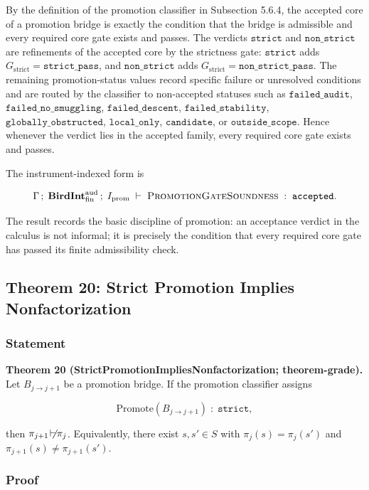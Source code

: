 \documentclass[11pt]{article}
\providecommand{\factor}{\mathrel{\!\vdash\!}}
\theoremstyle{definition}
\begin{document}
By the definition of the promotion classifier in Subsection 5.6.4, the accepted core of a promotion bridge is exactly the condition that the bridge is admissible and every required core gate exists and passes. The verdicts \(\texttt{strict}\) and \(\texttt{non\_strict}\) are refinements of the accepted core by the strictness gate: \(\texttt{strict}\) adds \(G_{\mathrm{strict}}=\texttt{strict\_pass}\), and \(\texttt{non\_strict}\) adds \(G_{\mathrm{strict}}=\texttt{non\_strict\_pass}\). The remaining promotion-status values record specific failure or unresolved conditions and are routed by the classifier to non-accepted statuses such as \(\texttt{failed\_audit}\), \(\texttt{failed\_no\_smuggling}\), \(\texttt{failed\_descent}\), \(\texttt{failed\_stability}\), \(\texttt{globally\_obstructed}\), \(\texttt{local\_only}\), \(\texttt{candidate}\), or \(\texttt{outside\_scope}\). Hence whenever the verdict lies in the accepted family, every required core gate exists and passes.

The instrument-indexed form is

\[
\Gamma\,;\;\mathbf{BirdInt}^{\mathrm{aud}}_{\mathrm{fin}}\,;\;I_{\mathrm{prom}}\;\vdash\;\textsc{PromotionGateSoundness}\;:\;\texttt{accepted}.
\]

The result records the basic discipline of promotion: an acceptance verdict in the calculus is not informal; it is precisely the condition that every required core gate has passed its finite admissibility check.

\subsection{Theorem 20: Strict Promotion Implies Nonfactorization}

\subsubsection{Statement}

\textbf{Theorem 20 (StrictPromotionImpliesNonfactorization; theorem-grade).} Let \(B_{j\to j+1}\) be a promotion bridge. If the promotion classifier assigns

\[
\mathrm{Promote}(B_{j\to j+1})\;:\;\texttt{strict},
\]

then \(\pi_{j+1}\not\factor\pi_j\). Equivalently, there exist \(s,s'\in S\) with \(\pi_j(s)=\pi_j(s')\) and \(\pi_{j+1}(s)\neq\pi_{j+1}(s')\).

\subsubsection{Proof}
\end{document}
